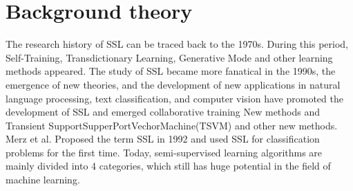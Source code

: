 \documentclass[11pt,en]{elegantpaper}
\begin{document}
\section{Background theory}
The research history of SSL can be traced back to the 1970s. During this period, Self-Training, Transdictionary Learning, Generative Mode and other learning methods appeared. 
The study of SSL became more fanatical in the 1990s, the emergence of new theories, and the development of new applications in natural language processing, text classification, and computer vision have promoted the development of SSL and emerged collaborative training New methods and Transient SupportSupperPortVechorMachine(TSVM) and other new methods.
Merz et al. Proposed the term SSL in 1992 and used SSL for classification problems for the first time. Today, semi-supervised learning algorithms are mainly divided into 4 categories, which still has huge potential in the field of machine learning.
\end{document}
